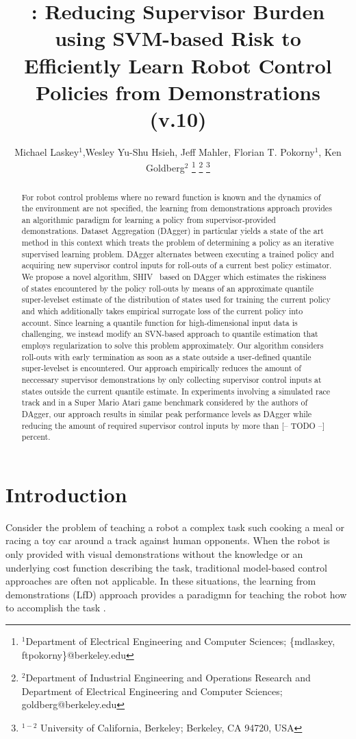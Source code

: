 \documentclass[10pt, conference]{ieeeconf}      %
\title{\LARGE \bf \acro: Reducing Supervisor Burden using SVM-based Risk to Efficiently Learn Robot Control Policies
from Demonstrations {\color{blue}(v.10)} }
\author{Michael Laskey$^1$,Wesley Yu-Shu Hsieh, Jeff Mahler, Florian T. Pokorny$^1$, Ken Goldberg$^2$%
\thanks{$^1$Department of Electrical Engineering and Computer Sciences; {\small \{mdlaskey, ftpokorny\}@berkeley.edu}}%
\thanks{$^2$Department of Industrial Engineering and Operations Research and Department of Electrical Engineering and Computer Sciences; {\small goldberg@berkeley.edu}}%
\thanks{$^{1-2}$ University of California, Berkeley;  Berkeley, CA 94720, USA}%
}
\newcommand{\acro}{SHIV}
\begin{document}
\maketitle
\thispagestyle{empty}
\pagestyle{empty}



\begin{abstract}
For robot control problems where no reward function is known and the dynamics of the environment are not specified, the
learning from demonstrations approach provides an algorithmic paradigm for learning a policy from supervisor-provided
demonstrations. Dataset Aggregation (DAgger) in particular yields a state of the art method in this context which treats
the problem of determining a policy as an iterative supervised learning problem. DAgger alternates between executing a
trained policy and acquiring new supervisor control inputs for roll-outs of a current best policy estimator. 
We propose a novel algorithm, \acro~ based on DAgger which estimates the riskiness of states
encountered by the policy roll-outs by means of an approximate quantile super-levelset estimate of the distribution of
states used for training the current policy and which additionally takes empirical surrogate loss of the current policy
into account. Since learning a quantile function for high-dimensional input data is
challenging, we instead modify an SVN-based approach to quantile estimation that employs regularization to solve this
problem approximately. Our algorithm considers roll-outs with early termination as soon as a state outside a
user-defined quantile super-levelset is encountered. Our approach empirically reduces the amount of neccessary
supervisor demonstrations by only collecting supervisor control inputs at states outside the current quantile estimate.
In experiments involving a simulated race track and in a Super Mario Atari game benchmark considered by the authors of
DAgger, our approach results in similar peak performance levels as DAgger while reducing the amount of required supervisor
control inputs by more than {\color{blue}[-- TODO --]} percent.
\end{abstract}



\section{Introduction} 
Consider the problem of teaching a robot a complex task such cooking a meal or racing a toy car around a track
against human opponents. When the robot is only provided with visual demonstrations without the knowledge or an
underlying cost function describing the task, traditional model-based control approaches are often not applicable. In
these situations, the learning from demonstrations (LfD) approach provides a paradigmn for teaching the robot how to
accomplish the task \cite{ross2013learning,pomerleau1989alvinn,schulman2013case}.
\end{document}
